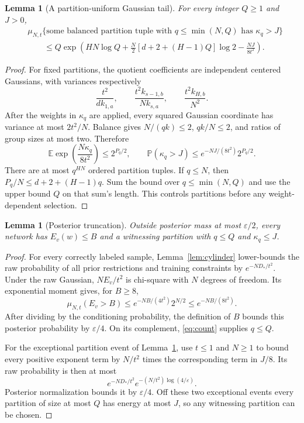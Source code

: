 \documentclass[11pt]{article}
\newtheorem{lemma}[theorem]{Lemma}
\newcommand{\E}{\mathbb E}
\newcommand{\Prb}{\mathbb P}
\begin{document}
\begin{lemma}[A partition-uniform Gaussian tail]\label{lem:partitions}
For every integer $Q\ge1$ and $J>0$,
\begin{align*}
 &\mu_{N,t}\{\text{some balanced partition tuple with }
           q\le\min(N,Q)\text{ has }\kappa_q>J\}\\
 &\qquad\le Q\exp\left(HN\log Q+
 \frac N2[d+2+(H-1)Q]\log2-\frac{NJ}{8t^2}\right).
\end{align*}
\end{lemma}
\begin{proof}
For fixed partitions, the quotient coefficients are independent centered
Gaussians, with variances respectively
\[
 \frac{t^2}{dk_{1,a}},\qquad
 \frac{t^2k_{s-1,b}}{Nk_{s,a}},\qquad
 \frac{t^2k_{H,b}}{N^2}.
\]
After the weights in $\kappa_q$ are applied, every squared Gaussian
coordinate has variance at most $2t^2/N$. Balance gives
$N/(qk)\le2$, $qk/N\le2$, and ratios of group sizes at most two.
Therefore
\[
 \E\exp\left(\frac{N\kappa_q}{8t^2}\right)\le2^{P_q/2},
 \qquad
 \Prb(\kappa_q>J)\le e^{-NJ/(8t^2)}2^{P_q/2}.
\]
There are at most $q^{HN}$ ordered partition tuples. If $q\le N$, then
$P_q/N\le d+2+(H-1)q$. Sum the bound over
$q\le\min(N,Q)$ and use the upper bound $Q$ on that sum's length.
This controls partitions before any weight-dependent selection.
\end{proof}

\begin{lemma}[Posterior truncation]\label{lem:truncation}
Outside posterior mass at most $\varepsilon/2$, every network has
$E_v(w)\le B$ and a witnessing partition with $q\le Q$ and
$\kappa_q\le J$.
\end{lemma}
\begin{proof}
For every correctly labeled sample, Lemma~\ref{lem:cylinder} lower-bounds
the raw probability of all prior restrictions and training constraints by
$e^{-ND_*/t^2}$. Under the raw Gaussian, $NE_v/t^2$ is chi-square with
$N$ degrees of freedom. Its exponential moment gives, for $B\ge8$,
\[
 \mu_{N,t}(E_v>B)\le
 e^{-NB/(4t^2)}2^{N/2}\le e^{-NB/(8t^2)}.
\]
After dividing by the conditioning probability, the definition of $B$
bounds this posterior probability by $\varepsilon/4$. On its complement,
\eqref{eq:count} supplies $q\le Q$.

For the exceptional partition event of Lemma~\ref{lem:partitions}, use
$t\le1$ and $N\ge1$ to bound every positive exponent term by $N/t^2$
times the corresponding term in $J/8$. Its raw probability is then at most
\[
 e^{-ND_*/t^2}e^{-(N/t^2)\log(4/\varepsilon)}.
\]
Posterior normalization bounds it by $\varepsilon/4$. Off these two
exceptional events every partition of size at most $Q$ has energy at most
$J$, so any witnessing partition can be chosen.
\end{proof}
\end{document}
